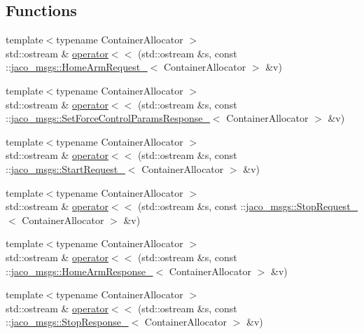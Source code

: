 \subsection*{Functions}
\begin{DoxyCompactItemize}
\item 
{\footnotesize template$<$typename Container\+Allocator $>$ }\\std\+::ostream \& \hyperlink{namespacejaco__msgs_adf3c5db0c5f652397d76edee87c59b05}{operator$<$$<$} (std\+::ostream \&s, const \+::\hyperlink{structjaco__msgs_1_1HomeArmRequest__}{jaco\+\_\+msgs\+::\+Home\+Arm\+Request\+\_\+}$<$ Container\+Allocator $>$ \&v)
\item 
{\footnotesize template$<$typename Container\+Allocator $>$ }\\std\+::ostream \& \hyperlink{namespacejaco__msgs_ae52f5c9efb7217f8e39ae16b4ec84687}{operator$<$$<$} (std\+::ostream \&s, const \+::\hyperlink{structjaco__msgs_1_1SetForceControlParamsResponse__}{jaco\+\_\+msgs\+::\+Set\+Force\+Control\+Params\+Response\+\_\+}$<$ Container\+Allocator $>$ \&v)
\item 
{\footnotesize template$<$typename Container\+Allocator $>$ }\\std\+::ostream \& \hyperlink{namespacejaco__msgs_aac309032a09455eba79fb08b18570788}{operator$<$$<$} (std\+::ostream \&s, const \+::\hyperlink{structjaco__msgs_1_1StartRequest__}{jaco\+\_\+msgs\+::\+Start\+Request\+\_\+}$<$ Container\+Allocator $>$ \&v)
\item 
{\footnotesize template$<$typename Container\+Allocator $>$ }\\std\+::ostream \& \hyperlink{namespacejaco__msgs_aef047b1cc459c95f4d825dc82f9ce1db}{operator$<$$<$} (std\+::ostream \&s, const \+::\hyperlink{structjaco__msgs_1_1StopRequest__}{jaco\+\_\+msgs\+::\+Stop\+Request\+\_\+}$<$ Container\+Allocator $>$ \&v)
\item 
{\footnotesize template$<$typename Container\+Allocator $>$ }\\std\+::ostream \& \hyperlink{namespacejaco__msgs_a5ff94222bfdeeaa2970c550479641dc1}{operator$<$$<$} (std\+::ostream \&s, const \+::\hyperlink{structjaco__msgs_1_1HomeArmResponse__}{jaco\+\_\+msgs\+::\+Home\+Arm\+Response\+\_\+}$<$ Container\+Allocator $>$ \&v)
\item 
{\footnotesize template$<$typename Container\+Allocator $>$ }\\std\+::ostream \& \hyperlink{namespacejaco__msgs_a9b287632be2561ffa7a0ab5ae6457e51}{operator$<$$<$} (std\+::ostream \&s, const \+::\hyperlink{structjaco__msgs_1_1StopResponse__}{jaco\+\_\+msgs\+::\+Stop\+Response\+\_\+}$<$ Container\+Allocator $>$ \&v)

\end{DoxyCompactItemize}
